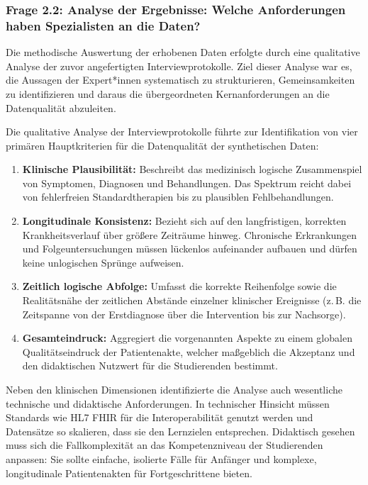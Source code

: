 \subsubsection{Frage 2.2: Analyse der Ergebnisse: Welche Anforderungen haben Spezialisten an die Daten?}

\begin{description}[style=nextline, font=\bfseries]

    \item[Methodik] 
    Die methodische Auswertung der erhobenen Daten erfolgte durch eine qualitative Analyse der zuvor angefertigten Interviewprotokolle. Ziel dieser Analyse war es, die Aussagen der Expert*innen systematisch zu strukturieren, Gemeinsamkeiten zu identifizieren und daraus die übergeordneten Kernanforderungen an die Datenqualität abzuleiten.

    \item[Ergebnisse] 
    Die qualitative Analyse der Interviewprotokolle führte zur Identifikation von vier primären Hauptkriterien für die Datenqualität der synthetischen Daten:
    \begin{enumerate}
        \item \textbf{Klinische Plausibilität:} Beschreibt das medizinisch logische Zusammenspiel von Symptomen, Diagnosen und Behandlungen. Das Spektrum reicht dabei von fehlerfreien Standardtherapien bis zu plausiblen Fehlbehandlungen.
        \item \textbf{Longitudinale Konsistenz:} Bezieht sich auf den langfristigen, korrekten Krankheitsverlauf über größere Zeiträume hinweg. Chronische Erkrankungen und Folgeuntersuchungen müssen lückenlos aufeinander aufbauen und dürfen keine unlogischen Sprünge aufweisen.
        \item \textbf{Zeitlich logische Abfolge:} Umfasst die korrekte Reihenfolge sowie die Realitätsnähe der zeitlichen Abstände einzelner klinischer Ereignisse (z.\,B. die Zeitspanne von der Erstdiagnose über die Intervention bis zur Nachsorge).
        \item \textbf{Gesamteindruck:} Aggregiert die vorgenannten Aspekte zu einem globalen Qualitätseindruck der Patientenakte, welcher maßgeblich die Akzeptanz und den didaktischen Nutzwert für die Studierenden bestimmt.
    \end{enumerate}

    Neben den klinischen Dimensionen identifizierte die Analyse auch wesentliche technische und didaktische Anforderungen. In technischer Hinsicht müssen Standards wie HL7 FHIR für die Interoperabilität genutzt werden und Datensätze so skalieren, dass sie den Lernzielen entsprechen. Didaktisch gesehen muss sich die Fallkomplexität an das Kompetenzniveau der Studierenden anpassen: Sie sollte einfache, isolierte Fälle für Anfänger und komplexe, longitudinale Patientenakten für Fortgeschrittene bieten.


\end{description}
